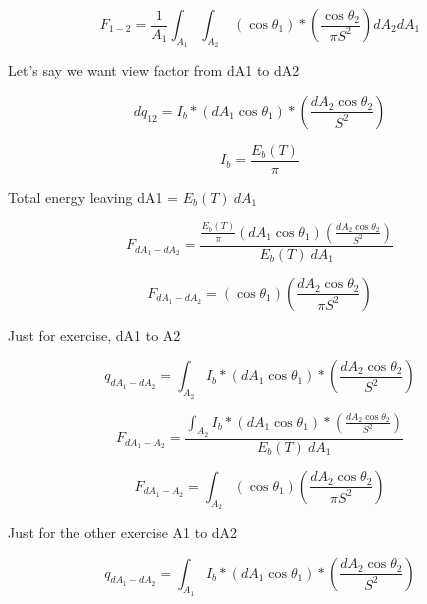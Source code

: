 \documentclass[12pt]{article}
\renewcommand{\_}{\kern-1.5pt\textunderscore\kern-1.5pt}
\begin{document}
\par

\par

 \[ F_{1-2}=\frac{1}{A_{1}} \int _{A_{1}}^{} \int _{A_{2}}^{}~ \left( \cos  \theta _{1} \right) \ast \left( \frac{\cos  \theta _{2}}{ \pi S^{2}} \right) dA_{2}dA_{1} \] \par

Let’s say we want view factor from dA1 to dA2\par

 \[ dq_{12}=I_{b}\ast \left( dA_{1}\cos  \theta _{1} \right) \ast \left( \frac{dA_{2}\cos  \theta _{2}}{S^{2}} \right)  \] \par

 \[ I_{b}=\frac{E_{b} \left( T \right) }{ \pi } \] \par

Total energy leaving dA1 =  \( E_{b} \left( T \right) ~dA_{1} \) \par

 \[ F_{dA_{1}-dA_{2}}=\frac{\frac{E_{b} \left( T \right) }{ \pi } \left( dA_{1}\cos  \theta _{1} \right)  \left( \frac{dA_{2}\cos  \theta _{2}}{S^{2}} \right) }{E_{b} \left( T \right) ~dA_{1}} \] \par

 \[ F_{dA_{1}-dA_{2}}= \left( \cos  \theta _{1} \right)  \left( \frac{dA_{2}\cos  \theta _{2}}{ \pi S^{2}} \right)  \] \par

Just for exercise, dA1 to A2\par

 \[ q_{dA_{1}-dA_{2}}= \int _{A_{2}}^{}I_{b}\ast \left( dA_{1}\cos  \theta _{1} \right) \ast \left( \frac{dA_{2}\cos  \theta _{2}}{S^{2}} \right)  \] \par

 \[ F_{dA_{1}-A_{2}}=\frac{ \int _{A_{2}}^{}I_{b}\ast \left( dA_{1}\cos  \theta _{1} \right) \ast \left( \frac{dA_{2}\cos  \theta _{2}}{S^{2}} \right) }{E_{b} \left( T \right) ~dA_{1}} \] \par

 \[ F_{dA_{1}-A_{2}}= \int _{A_{2}}^{} \left( \cos  \theta _{1} \right)  \left( \frac{dA_{2}\cos  \theta _{2}}{ \pi S^{2}} \right)  \] \par

\par

Just for the other exercise A1 to dA2\par

 \[ q_{dA_{1}-dA_{2}}= \int _{A_{1}}^{}I_{b}\ast \left( dA_{1}\cos  \theta _{1} \right) \ast \left( \frac{dA_{2}\cos  \theta _{2}}{S^{2}} \right)  \] \par
\end{document}
